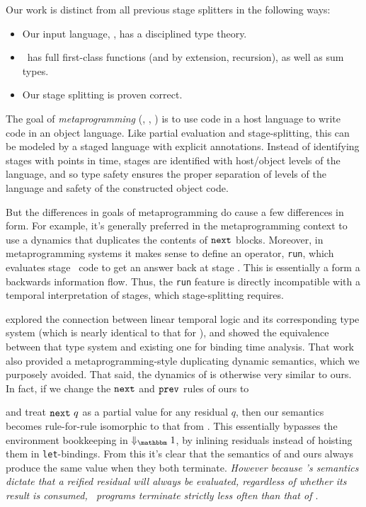 Our work is distinct from all previous stage splitters in the following ways:
\begin{itemize}
\item Our input language, \lang, has a disciplined type theory.
\item \lang\ has full first-class functions (and by extension, recursion), as well as sum types.
\item Our stage splitting is proven correct.
\end{itemize}

The goal of {\em metaprogramming} (\cite{taha-thesis-99}, \cite{devito13}, \cite{davies01}) is 
to use code in a host language to write code in an object language.
Like partial evaluation and stage-splitting, this can be modeled by a staged language with explicit annotations.
Instead of identifying stages with points in time, stages are identified with host/object levels of the language,
and so type safety ensures the proper separation of levels of the language and safety of the constructed object code.

But the differences in goals of metaprogramming do cause a few differences in form.
For example, it's generally preferred in the metaprogramming context to use 
a dynamics that duplicates the contents of ${\tt next}$ blocks.
Moreover, in metaprogramming systems it makes sense to define an operator, \texttt{run}, 
which evaluates stage \bbtwo\ code to get an answer back at stage \bbone.
This is essentially a form a backwards information flow.
Thus, the \texttt{run} feature is directly incompatible with a temporal interpretation of stages,
which stage-splitting requires.

\cite{davies96} explored the connection between linear temporal logic and its corresponding type system (which is nearly identical to that for \lang), 
and showed the equivalence between that type system and existing one for binding time analysis. 
That work also provided a metaprogramming-style duplicating dynamic semantics, which we purposely avoided.
That said, the dynamics of \cite{davies96} is otherwise very similar to ours.
In fact, if we change the ${\tt next}$ and ${\tt prev}$ rules of ours to 
and treat ${\tt next}~q$ as a partial value for any residual $q$,
then our semantics becomes rule-for-rule isomorphic to that from \cite{davies96}. This essentially bypasses the
environment bookkeeping in $\redonesym$, by inlining residuals instead of
hoisting them in \verb|let|-bindings.
From this it's clear that the semantics of \cite{davies96} and ours always produce the same value when they both terminate.
{\em However because \lang's semantics dictate that a reified residual will always be evaluated, regardless of whether its result is consumed, \lang\ programs terminate strictly less often than that of \cite{davies96}}.

